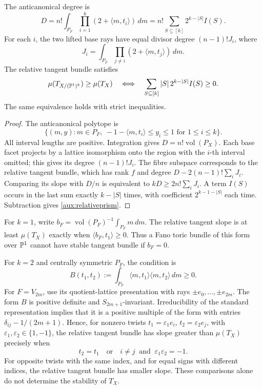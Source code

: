 \begin{proposition}\label{aux:prism}
The anticanonical degree is
\[
 D=n!\int_{P_F}\prod_{i=1}^k(2+\langle m,t_i\rangle)\,dm
   =n!\sum_{S\subseteq[k]}2^{k-|S|}I(S).
\]
For each $i$, the two lifted base rays have equal divisor degree
$(n-1)!J_i$, where
\[
 J_i=\int_{P_F}\prod_{j\ne i}(2+\langle m,t_j\rangle)\,dm.
\]
The relative tangent bundle satisfies
\begin{equation}\label{aux:relativeprism}
 \mu(T_{X/(\mathbb{P}^1)^k})\ge\mu(T_X)
 \quad\Longleftrightarrow\quad
 \sum_{S\subseteq[k]}|S|\,2^{k-|S|}I(S)\ge0.
\end{equation}
The same equivalence holds with strict inequalities.
\end{proposition}

\begin{proof}
The anticanonical polytope is
\[
 \{(m,y):m\in P_F,\ -1-\langle m,t_i\rangle\le y_i\le1
                              \text{ for }1\le i\le k\}.
\]
All interval lengths are positive. Integration gives $D=n!\operatorname{vol}(P_X)$.
Each base facet projects by a lattice isomorphism onto the region
with the $i$-th interval omitted; this gives its degree $(n-1)!J_i$.
The fibre subspace corresponds to the relative tangent bundle,
which has rank $f$ and degree $D-2(n-1)!\sum_iJ_i$.
Comparing its slope with $D/n$ is equivalent to
$kD\ge2n!\sum_iJ_i$. A term $I(S)$ occurs in the last sum exactly
$k-|S|$ times, with coefficient $2^{k-1-|S|}$ each time.
Subtraction gives \eqref{aux:relativeprism}.
\end{proof}

For $k=1$, write $b_F=\operatorname{vol}(P_F)^{-1}\int_{P_F}m\,dm$.
The relative tangent slope is at least $\mu(T_X)$ exactly when
$\langle b_F,t_1\rangle\ge0$. Thus a Fano toric bundle of this form
over $\mathbb{P}^1$ cannot have stable tangent bundle if $b_F=0$.

For $k=2$ and centrally symmetric $P_F$, the condition is
\[
 B(t_1,t_2):=\int_{P_F}\langle m,t_1\rangle\langle m,t_2\rangle\,dm\ge0.
\]
For $F=V_{2m}$, use its quotient-lattice presentation with rays
$\pm e_0,\ldots,\pm e_{2m}$. The form $B$ is positive definite and
$S_{2m+1}$-invariant. Irreducibility of the standard representation
implies that it is a positive multiple of the form with entries
$\delta_{ij}-1/(2m+1)$. Hence, for nonzero twists
$t_1=\varepsilon_1e_i$, $t_2=\varepsilon_2e_j$, with
$\varepsilon_1,\varepsilon_2\in\{1,-1\}$, the relative tangent
bundle has slope greater than $\mu(T_X)$ precisely when
\[
 t_2=t_1\quad\text{or}\quad
 i\ne j\ \text{ and }\ \varepsilon_1\varepsilon_2=-1.
\]
For opposite twists with the same index, and for equal signs with
different indices, the relative tangent bundle has smaller slope.
These comparisons alone do not determine the stability of $T_X$.

